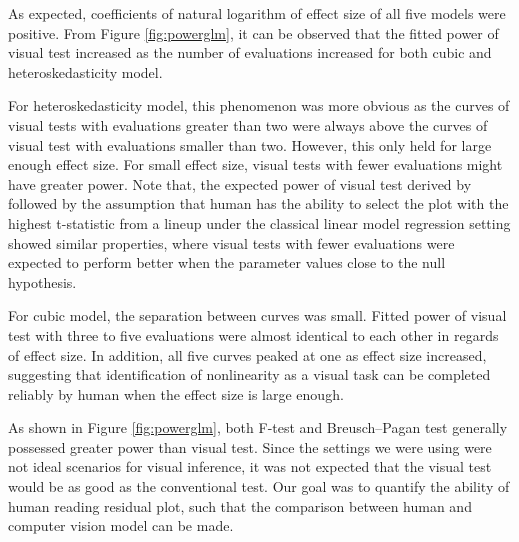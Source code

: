 \documentclass{monashthesis}
\theoremstyle{definition}
\theoremstyle{definition}
\theoremstyle{definition}
\theoremstyle{definition}
\theoremstyle{remark}
\begin{document}
As expected, coefficients of natural logarithm of effect size of all five models were positive. From Figure \ref{fig:powerglm}, it can be observed that the fitted power of visual test increased as the number of evaluations increased for both cubic and heteroskedasticity model.

For heteroskedasticity model, this phenomenon was more obvious as the curves of visual tests with evaluations greater than two were always above the curves of visual test with evaluations smaller than two. However, this only held for large enough effect size. For small effect size, visual tests with fewer evaluations might have greater power. Note that, the expected power of visual test derived by \textcite{majumder_validation_2013} followed by the assumption that human has the ability to select the plot with the highest t-statistic from a lineup under the classical linear model regression setting showed similar properties, where visual tests with fewer evaluations were expected to perform better when the parameter values close to the null hypothesis.

For cubic model, the separation between curves was small. Fitted power of visual test with three to five evaluations were almost identical to each other in regards of effect size. In addition, all five curves peaked at one as effect size increased, suggesting that identification of nonlinearity as a visual task can be completed reliably by human when the effect size is large enough.

As shown in Figure \ref{fig:powerglm}, both F-test and Breusch--Pagan test generally possessed greater power than visual test. Since the settings we were using were not ideal scenarios for visual inference, it was not expected that the visual test would be as good as the conventional test. Our goal was to quantify the ability of human reading residual plot, such that the comparison between human and computer vision model can be made.
\end{document}
